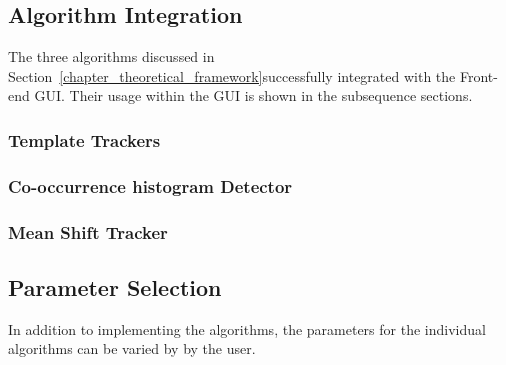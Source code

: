 \subsection{Algorithm Integration}
The three algorithms discussed in Section~\ref{chapter_theoretical_framework}successfully integrated with the Front-end GUI. Their usage
within the GUI is shown in the subsequence sections.

\subsubsection{Template Trackers}

\subsubsection{Co-occurrence histogram Detector}

\subsubsection{Mean Shift Tracker}

\subsection{Parameter Selection}
In addition to implementing the algorithms, the parameters for the individual
algorithms can be varied by by the user.


\subsection{}
